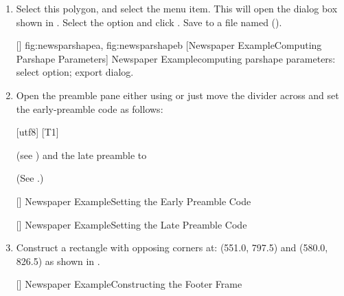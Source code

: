 \begin{enumerate}
[]
{}
{Newspaper Example\dash Added Polygon Defining Text Region}

\item Select this polygon, and select the  menu
item. This will open the  dialog box shown in
.  Select the
 option and click .  Save to a
file named 
().

[]
{
 {fig:newsparshapea}{}{},
 {fig:newsparshapeb}{}{}
}
[Newspaper Example\dash Computing Parshape Parameters]
{Newspaper Example\dash computing \gls{parshape}
parameters:
 select  option;
 export dialog.}

\item Open the preamble pane either using 
 or just move the divider across and set the
\gls{early-preamble} code as follows:
\begin{compactcodebox}
[utf8]
[T1]
\end{compactcodebox}%
(see ) and the late preamble to
\begin{compactcodebox*}
\end{compactcodebox*}%
(See .)

[]
{}
{Newspaper Example\dash Setting the Early Preamble Code}

[]
{}
{Newspaper Example\dash Setting the Late Preamble Code}

\item Construct a rectangle with opposing corners at: (551.0, 797.5)
and (580.0, 826.5) as shown in .

[]
{}
{Newspaper Example\dash Constructing the Footer Frame}


\end{enumerate}
